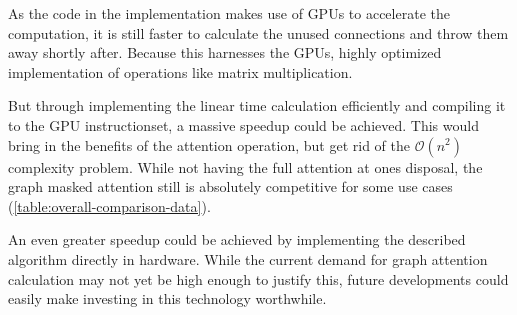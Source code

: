 As the code in the implementation makes use of GPUs to accelerate the computation, it is still faster to calculate the unused connections and \glqq throw\grqq{} them away shortly after.
Because this harnesses the GPUs, highly optimized implementation of operations like matrix multiplication.

But through implementing the linear time calculation efficiently and compiling it to the GPU instructionset, a massive speedup could be achieved. 
This would bring in the benefits of the attention operation, but get rid of the $\mathcal{O}(n^2)$ complexity problem.
While not having the full attention at ones disposal, the graph masked attention still is absolutely competitive for some use cases (\autoref{table:overall-comparison-data}).

An even greater speedup could be achieved by implementing the described algorithm directly in hardware.
While the current demand for graph attention calculation may not yet be high enough to justify this, future developments could easily make investing in this technology worthwhile.
